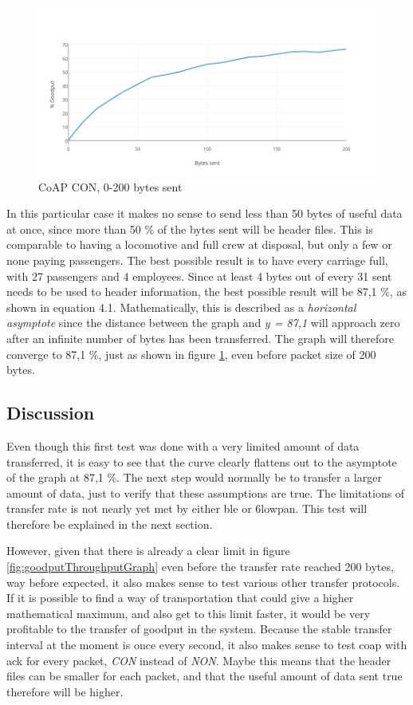 \begin{figure}[ht]
    \centering
    \includegraphics[scale=0.43]{CoAP_CONgraph2.png}    
    \caption{CoAP CON, 0-200 bytes sent}
    \label{fig:coapCON0200}
\end{figure}



In this particular case it makes no sense to send less than 50 bytes of useful data at once, since more than 50 \% of the bytes sent will be header files. This is comparable to having a locomotive and full crew at disposal, but only a few or none paying passengers. The best possible result is to have every carriage full, with 27 passengers and 4 employees. Since at least 4 bytes out of every 31 sent needs to be used to header information, the best possible result will be 87,1 \%, as shown in equation 4.1. Mathematically, this is described as a \textit{horizontal asymptote} since the distance between the graph and \textit{y = 87,1} will approach zero after an infinite number of bytes has been transferred. The graph will therefore converge to 87,1 \%, just as shown in figure \ref{fig:coapCON0200}, even before packet size of 200 bytes.  

\subsection{Discussion}

Even though this first test was done with a very limited amount of data transferred, it is easy to see that the curve clearly flattens out to the asymptote of the graph at 87,1 \%. The next step would normally be to transfer a larger amount of data, just to verify that these assumptions are true. The limitations of transfer rate is not nearly yet met by either \gls{ble} or \gls{6lowpan}. This test will therefore be explained in the next section. 


However, given that there is already a clear limit in figure \ref{fig:goodputThroughputGraph} even before the transfer rate reached 200 bytes, way before expected, it also makes sense to test various other transfer protocols. If it is possible to find a way of transportation that could give a higher mathematical maximum, and also get to this limit faster, it would be very profitable to the transfer of goodput in the system. Because the stable transfer interval at the moment is once every second, it also makes sense to test \gls{coap} with \gls{ack} for every packet, \textit{CON} instead of \textit{NON}. Maybe this means that the header files can be smaller for each packet, and that the useful amount of data sent true therefore will be higher. 


